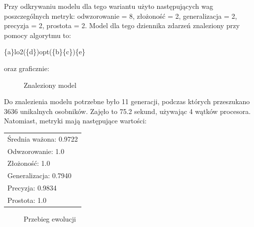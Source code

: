 Przy odkrywaniu modelu dla tego wariantu użyto następujących wag poszczególnych metryk: odwzorowanie = 8, złożoność = 2, generalizacja = 2, precyzja = 2, prostota = 2. Model dla tego dziennika zdarzeń znaleziony przy pomocy algorytmu to:
\begin{center}
	\{a\}lo2(\{d\})opt(\{b\}\{c\})\{e\}
\end{center}
oraz graficznie:

\begin{figure}[H]
	\caption{\label{fig:flow_chart}Znaleziony model}
\end{figure}

Do znalezienia modelu potrzebne było 11 generacji, podczas których przeszukano 3636 unikalnych osobników. Zajęło to 75.2 sekund, używając 4 wątków procesora. Natomiast, metryki mają następujące wartości: 

 \begin{center}
  \begin{tabular}{l}
	Średnia ważona: 0.9722 \\
	Odwzorowanie: 1.0 \\
	Złożoność: 1.0 \\
	Generalizacja: 0.7940 \\
	Precyzja: 0.9834 \\
	Prostota: 1.0
  \end{tabular}
 \end{center}
 
\begin{figure}[H]
	\caption{\label{fig:flow_chart}Przebieg ewolucji}
\end{figure}

